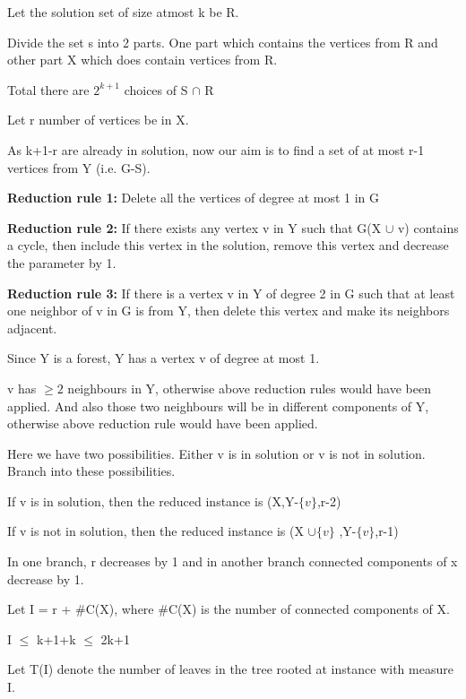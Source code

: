 Let the solution set of size atmost k be R.

Divide the set s into 2 parts. One part which contains the vertices from R and other part X which does 
contain vertices from R.

Total there are $2^{k+1}$ choices of S $\cap$ R

Let r number of vertices be in X.

As k+1-r are already in solution, now our aim is to find a set of at most r-1 vertices 
from Y (i.e. G-S).

 \textbf{Reduction rule 1:}
Delete all the vertices of degree at most 1 in G

 \textbf{Reduction rule 2:}
If there exists any vertex v in Y such that G(X $\cup$ v) contains a cycle,
then include this vertex in the solution, remove this vertex and decrease the parameter by 1.

 \textbf{Reduction rule 3:}
If there is a vertex v in Y of degree 2 in G such
that at least one neighbor of v in G is from Y, then delete this vertex
and make its neighbors adjacent.

\vspace{0.3cm}
Since Y is a forest, Y has a vertex v of degree at most 1. 

\vspace{0.3cm}
v has $\geq2$ neighbours in Y, otherwise above reduction rules would have been applied.
And also those two neighbours will be in different components of Y, otherwise above reduction
rule would have been applied. 

\vspace{0.3cm}
Here we have two possibilities. Either v is in solution or v is not in solution.
Branch into these possibilities. 

If v is in solution, then the reduced instance is (X,Y-$\{v\}$,r-2) 

If v is not in solution, then the reduced instance is (X $ \cup \{v\}$ ,Y-$\{v\}$,r-1)

\vspace{0.3cm}
In one branch, r decreases by 1 and in another branch connected components of x decrease by 1.

\vspace{0.3cm}
Let I = r + \#C(X), where \#C(X) is the number of connected components of X. 

\hspace*{2cm}I $\leq$ k+1+k $\leq$ 2k+1

Let T(I) denote the number of leaves in the tree rooted at instance with measure I.


